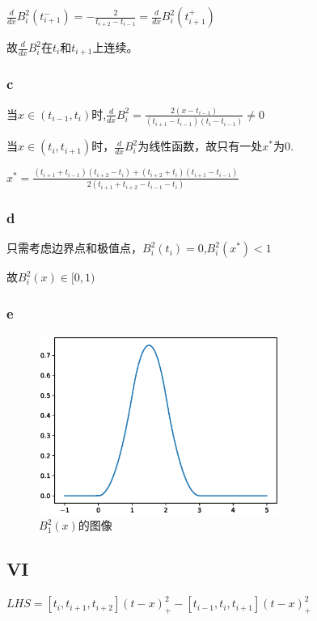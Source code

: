 \documentclass[12]{article}%
\begin{document}
            $\frac{d}{dx}B^2_i(t_{i+1}^-)=-\frac{2}{t_{i+2}-t_{i-1}}=\frac{d}{dx}B^2_i(t_{i+1}^+)$
            
            故$\frac{d}{dx}B^2_i$在$t_i$和$t_{i+1}$上连续。

            \subsubsection{c}
            当$x\in(t_{i-1},t_i)$时,$\frac{d}{dx}B^2_i=\frac{2(x-t_{i-1})}{(t_{i+1}-t_{i-1})(t_i-t_{i-1})}\neq 0$

            当$x\in(t_{i},t_{i+1})$时，$\frac{d}{dx}B^2_i$为线性函数，故只有一处$x^*$为0.

            $x^*=\frac{(t_{i+1}+t_{i-1})(t_{i+2}-t_{i})+(t_{i+2}+t_{i})(t_{i+1}-t_{i-1})}{2(t_{i+1}+t_{i+2}-t_{i-1}-t_{i})}$

            \subsubsection{d}
            只需考虑边界点和极值点，$B_i^2(t_i)=0$,$B_i^2(x^*)< 1$

            故$B^2_i(x)\in [0,1)$
            \subsubsection{e}
            \begin{figure}[H]
                \centering
                \includegraphics[width=0.7\textwidth]{./pic/e.eps}
                \caption{$B_1^2(x)$的图像}
            \end{figure}

        \subsection{VI}
        $LHS=[t_i,t_{i+1},t_{i+2}](t-x)^2_+-[t_{i-1},t_{i},t_{i+1}](t-x)^2_+$
\end{document}
